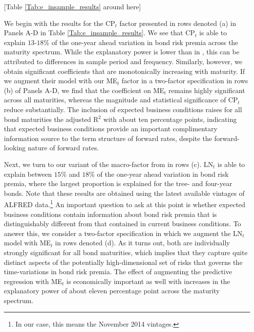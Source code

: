 \documentclass[12pt,letterpaper,leqno,doublespacing]{article}
\begin{document}
\begin{center}
    [Table \ref{Tab:e_insample_results} around here]
\end{center}

We begin with the results for the CP$_{t}$ factor presented in rows denoted (a) in Panels A-D in Table \ref{Tab:e_insample_results}. We see that CP$_{t}$ is able to explain $13$-$18\%$ of the one-year ahead variation in bond risk premia across the maturity spectrum. While the explanatory power is lower than in \cite{CochranePiazzesi2005}, this can be attributed to differences in sample period and frequency. Similarly, however, we obtain significant coefficients that are monotonically increasing with maturity. If we augment their model with our ME$_{t}$ factor in a two-factor specification in rows (b) of Panels A-D, we find that the coefficient on ME$_{t}$ remains highly significant across all maturities, whereas the magnitude and statistical significance of CP$_{t}$ reduce substantially. The inclusion of expected business conditions raises for all bond maturities the adjusted R$^{2}$ with about ten percentage points, indicating that expected business conditions provide an important complimentary information source to the term structure of forward rates, despite the forward-looking nature of forward rates. 

Next, we turn to our variant of the macro-factor from \cite{LudvigsonNg2009} in rows (c). LN$_{t}$ is able to explain between $15\%$ and $18\%$ of the one-year ahead variation in bond risk premia, where the largest proportion is explained for the tree- and four-year bonds. Note that these results are obtained using the latest available vintages of ALFRED data.\footnote{In our case, this means the November 2014 vintages.} An important question to ask at this point is whether expected business conditions contain information about bond risk premia that is distinguishably different from that contained in current business conditions. To answer this, we consider a two-factor specification in which we augment the LN$_{t}$ model with ME$_{t}$ in rows denoted (d). As it turns out, both are individually strongly significant for all bond maturities, which implies that they capture quite distinct aspects of the potentially high-dimensional set of risks that governs the time-variations in bond risk premia. The effect of augmenting the predictive regression with ME$_{t}$ is economically important as well with increases in the explanatory power of about eleven percentage point across the maturity spectrum. 
\end{document}
